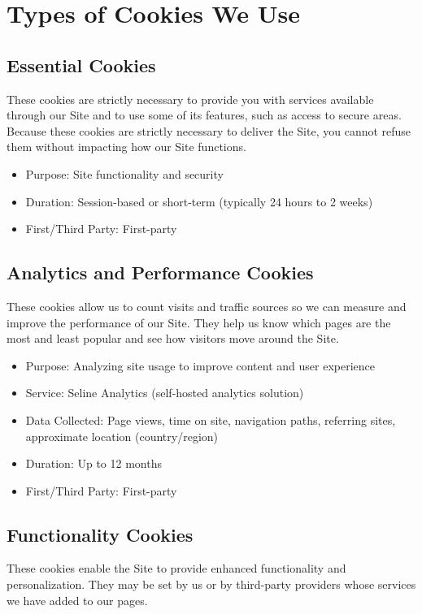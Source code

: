 \documentclass[11pt]{article}
\begin{document}
\section{Types of Cookies We Use}

\subsection{Essential Cookies}
These cookies are strictly necessary to provide you with services available through our Site and to use some of its features, such as access to secure areas. Because these cookies are strictly necessary to deliver the Site, you cannot refuse them without impacting how our Site functions.

\begin{itemize}
  \item Purpose: Site functionality and security
  \item Duration: Session-based or short-term (typically 24 hours to 2 weeks)
  \item First/Third Party: First-party
\end{itemize}

\subsection{Analytics and Performance Cookies}
These cookies allow us to count visits and traffic sources so we can measure and improve the performance of our Site. They help us know which pages are the most and least popular and see how visitors move around the Site.

\begin{itemize}
  \item Purpose: Analyzing site usage to improve content and user experience
  \item Service: Seline Analytics (self-hosted analytics solution)
  \item Data Collected: Page views, time on site, navigation paths, referring sites, approximate location (country/region)
  \item Duration: Up to 12 months
  \item First/Third Party: First-party
\end{itemize}

\subsection{Functionality Cookies}
These cookies enable the Site to provide enhanced functionality and personalization. They may be set by us or by third-party providers whose services we have added to our pages.
\end{document}
